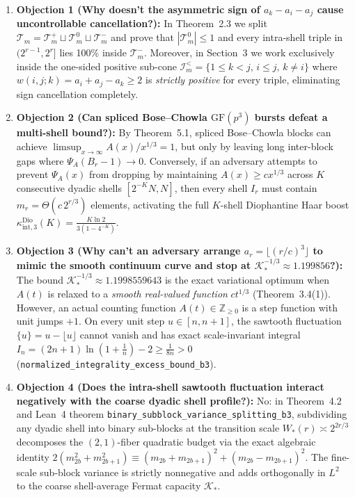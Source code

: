 \documentclass[11pt,a4paper]{article}
\theoremstyle{remark}
\begin{document}
\begin{objectionbox}
\begin{enumerate}
  \item \textbf{Objection 1 (Why doesn't the asymmetric sign of $a_k - a_i - a_j$ cause uncontrollable cancellation?):}
  In Theorem~2.3 we split $\mathcal{T}_m = \mathcal{T}_m^+ \sqcup \mathcal{T}_m^0 \sqcup \mathcal{T}_m^-$ and prove that $|\mathcal{T}_m^0| \le 1$ and every intra-shell triple in $(2^{r-1}, 2^r]$ lies 100\% inside $\mathcal{T}_m^-$. Moreover, in Section~3 we work exclusively inside the one-sided positive sub-cone $\mathcal{I}_m^{<} = \{1 \le k < j,\, i \le j,\, k \ne i\}$ where $w(i, j; k) = a_i + a_j - a_k \ge 2$ is \emph{strictly positive} for every triple, eliminating sign cancellation completely.
  \item \textbf{Objection 2 (Can spliced Bose--Chowla $\mathrm{GF}(p^3)$ bursts defeat a multi-shell bound?):}
  By Theorem~5.1, spliced Bose--Chowla blocks can achieve $\limsup_{x\to\infty} A(x)/x^{1/3} = 1$, but only by leaving long inter-block gaps where $\Psi_A(B_r - 1) \to 0$. Conversely, if an adversary attempts to prevent $\Psi_A(x)$ from dropping by maintaining $A(x) \ge c x^{1/3}$ across $K$ consecutive dyadic shells $[2^{-K}N, N]$, then every shell $I_r$ must contain $m_r = \Theta(c\,2^{r/3})$ elements, activating the full $K$-shell Diophantine Haar boost $\kappa_{\mathrm{int}, 3}^{\mathrm{Dio}}(K) = \frac{K\ln 2}{3(1 - 4^{-K})}$.
  \item \textbf{Objection 3 (Why can't an adversary arrange $a_r = \lfloor (r/c)^3 \rfloor$ to mimic the smooth continuum curve and stop at $\mathcal{K}_*^{-1/3} \approx 1.199856$?):}
  The bound $\mathcal{K}_*^{-1/3} \approx 1.1998559643$ is the exact variational optimum when $A(t)$ is relaxed to a \emph{smooth real-valued function} $c t^{1/3}$ (Theorem~3.4(1)). However, an actual counting function $A(t) \in \mathbb{Z}_{\ge 0}$ is a step function with unit jumps $+1$. On every unit step $u \in [n, n+1]$, the sawtooth fluctuation $\{u\} = u - \lfloor u \rfloor$ cannot vanish and has exact scale-invariant integral $I_n = (2n+1)\ln(1+\frac{1}{n}) - 2 \ge \frac{1}{8n} > 0$ (\texttt{normalized\_integrality\_excess\_bound\_b3}).
  \item \textbf{Objection 4 (Does the intra-shell sawtooth fluctuation interact negatively with the coarse dyadic shell profile?):}
  No: in Theorem~4.2 and Lean~4 theorem \texttt{binary\_subblock\_variance\_splitting\_b3}, subdividing any dyadic shell into binary sub-blocks at the transition scale $W_*(r) \asymp 2^{2r/3}$ decomposes the $(2,1)$-fiber quadratic budget via the exact algebraic identity $2(m_{2b}^2 + m_{2b+1}^2) \equiv (m_{2b} + m_{2b+1})^2 + (m_{2b} - m_{2b+1})^2$. The fine-scale sub-block variance is strictly nonnegative and adds orthogonally in $L^2$ to the coarse shell-average Fermat capacity $\mathcal{K}_*$.

\end{enumerate}
\end{objectionbox}
\end{document}
